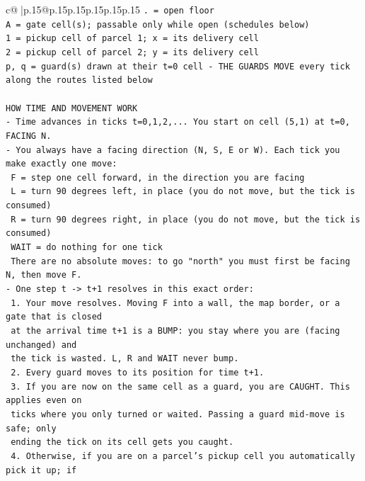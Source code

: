 \documentclass{article}
\begin{document}
{\begin{supertabular}{c@{$\;$}|p{.15\linewidth}@{}p{.15\linewidth}p{.15\linewidth}p{.15\linewidth}p{.15\linewidth}p{.15\linewidth}}
{{{\texttt{. = open floor} \\
\texttt{A = gate cell(s); passable only while open (schedules below)} \\
\texttt{1 = pickup cell of parcel 1; x = its delivery cell} \\
\texttt{2 = pickup cell of parcel 2; y = its delivery cell} \\
\texttt{p, q = guard(s) drawn at their t=0 cell {-} THE GUARDS MOVE every tick along the routes listed below} \\
\\ 
\texttt{HOW TIME AND MOVEMENT WORK} \\
\texttt{{-} Time advances in ticks t=0,1,2,... You start on cell (5,1) at t=0, FACING N.} \\
\texttt{{-} You always have a facing direction (N, S, E or W). Each tick you make exactly one move:} \\
\texttt{  F    = step one cell forward, in the direction you are facing} \\
\texttt{  L    = turn 90 degrees left, in place (you do not move, but the tick is consumed)} \\
\texttt{  R    = turn 90 degrees right, in place (you do not move, but the tick is consumed)} \\
\texttt{  WAIT = do nothing for one tick} \\
\texttt{  There are no absolute moves: to go "north" you must first be facing N, then move F.} \\
\texttt{{-} One step t {-}> t+1 resolves in this exact order:} \\
\texttt{  1. Your move resolves. Moving F into a wall, the map border, or a gate that is closed} \\
\texttt{     at the arrival time t+1 is a BUMP: you stay where you are (facing unchanged) and} \\
\texttt{     the tick is wasted. L, R and WAIT never bump.} \\
\texttt{  2. Every guard moves to its position for time t+1.} \\
\texttt{  3. If you are now on the same cell as a guard, you are CAUGHT. This applies even on} \\
\texttt{     ticks where you only turned or waited. Passing a guard mid{-}move is safe; only} \\
\texttt{     ending the tick on its cell gets you caught.} \\
\texttt{  4. Otherwise, if you are on a parcel's pickup cell you automatically pick it up; if} \\
}}}
\end{supertabular}}
\end{document}

